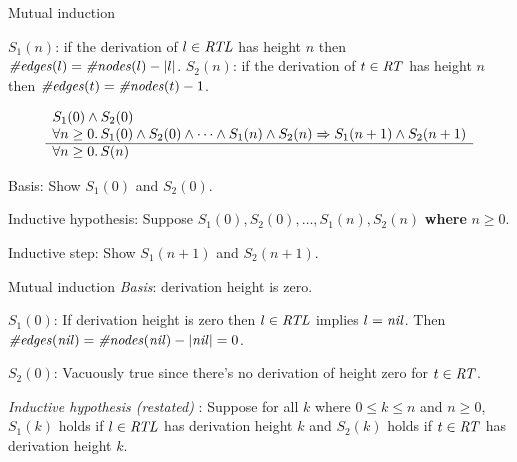 \documentclass[style=sailor,size=12pt]{powerdot}
\begin{document}
\begin{wideslide}[bm=,toc=]{Mutual induction}

\vspace{1em}
$S_1(n)$: if the derivation of $l\in \mbox{\it RTL\/}$ has height $n$ then
$\mbox{\it \#edges\/}(l) = \mbox{\it \#nodes\/}(l) - |l|$.
$S_2(n)$: if the derivation of $t\in \mbox{\it RT\/}$ has height $n$ then
$\mbox{\it \#edges\/}(t) = \mbox{\it \#nodes\/}(t) - 1$.

\vspace{1em}



\begin{displaymath}
\begin{array}[t]{l}
S_1(0)\wedge S_2(0) \\
\forall n\geq 0.\, S_1(0)\wedge S_2(0) \wedge \cdots \wedge
S_1(n)\wedge S_2(n)\Rightarrow S_1(n+1)\wedge S_2(n+1)\\
\hline
\forall n\geq 0.\, S(n)
\end{array}
\end{displaymath}

\vspace{1em}
Basis: Show $S_1(0)$ and $S_2(0)$.

\vspace{1em}
Inductive hypothesis: Suppose $S_1(0), S_2(0), \ldots ,S_1(n),S_2(n)$ {\bf where} $n\geq 0$.

\vspace{1em}
Inductive step: Show $S_1(n+1)$ and $S_2(n+1)$.

\end{wideslide}
\begin{wideslide}[bm=,toc=]{Mutual induction}
{\em Basis\/}: derivation height is zero.

\vspace{1em}
$S_1(0)$: If derivation height is zero then $l\in\mbox{\it RTL\/}$ implies $l=\mbox{\it nil\/}$.
Then $\mbox{\it \#edges\/}(\mbox{\it nil\/})=\mbox{\it \#nodes\/}(\mbox{\it nil\/}) - |\mbox{\it nil\/}| = 0$.

\vspace{1em}
$S_2(0)$: Vacuously true since there's no derivation of height zero for $t\in\mbox{\it RT\/}$.

\vspace{2em}
{\em Inductive hypothesis (restated)\/} :  Suppose for all $k$ where $0\leq k\leq n$ and $n\geq 0$,
$S_1(k)$ holds if $l\in\mbox{\it RTL\/}$ has derivation height $k$ and
$S_2(k)$ holds if $t\in\mbox{\it RT\/}$ has derivation height $k$.
\end{wideslide}
\end{document}
